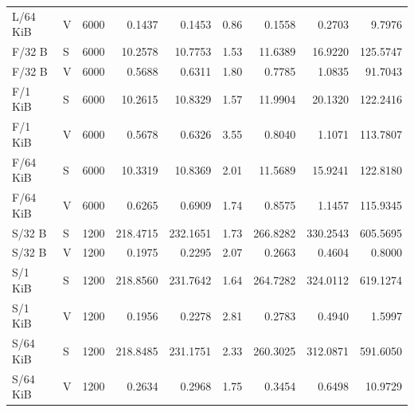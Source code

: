 \begin{table}[t]
\begin{tabular}{llrrrrrrr}
L/64 KiB & V & 6000 & 0.1437 & 0.1453 & 0.86 & 0.1558 & 0.2703 & 9.7976\\
F/32 B & S & 6000 & 10.2578 & 10.7753 & 1.53 & 11.6389 & 16.9220 & 125.5747\\
F/32 B & V & 6000 & 0.5688 & 0.6311 & 1.80 & 0.7785 & 1.0835 & 91.7043\\
F/1 KiB & S & 6000 & 10.2615 & 10.8329 & 1.57 & 11.9904 & 20.1320 & 122.2416\\
F/1 KiB & V & 6000 & 0.5678 & 0.6326 & 3.55 & 0.8040 & 1.1071 & 113.7807\\
F/64 KiB & S & 6000 & 10.3319 & 10.8369 & 2.01 & 11.5689 & 15.9241 & 122.8180\\
F/64 KiB & V & 6000 & 0.6265 & 0.6909 & 1.74 & 0.8575 & 1.1457 & 115.9345\\
S/32 B & S & 1200 & 218.4715 & 232.1651 & 1.73 & 266.8282 & 330.2543 & 605.5695\\
S/32 B & V & 1200 & 0.1975 & 0.2295 & 2.07 & 0.2663 & 0.4604 & 0.8000\\
S/1 KiB & S & 1200 & 218.8560 & 231.7642 & 1.64 & 264.7282 & 324.0112 & 619.1274\\
S/1 KiB & V & 1200 & 0.1956 & 0.2278 & 2.81 & 0.2783 & 0.4940 & 1.5997\\
S/64 KiB & S & 1200 & 218.8485 & 231.1751 & 2.33 & 260.3025 & 312.0871 & 591.6050\\
S/64 KiB & V & 1200 & 0.2634 & 0.2968 & 1.75 & 0.3454 & 0.6498 & 10.9729\\
\bottomrule\end{tabular}
\end{table}

